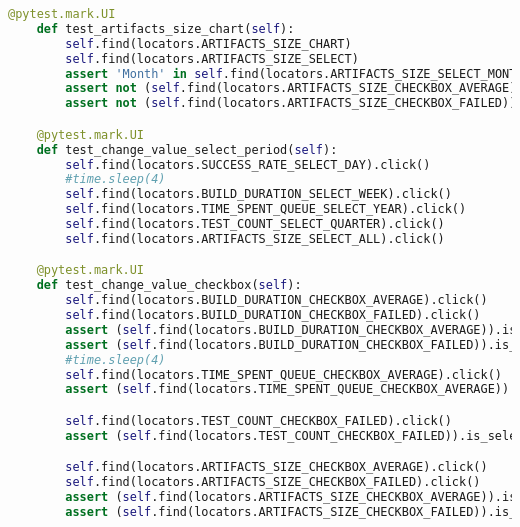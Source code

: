 \begin{lstlisting}[language=Python]
    @pytest.mark.UI
    def test_artifacts_size_chart(self):
        self.find(locators.ARTIFACTS_SIZE_CHART)
        self.find(locators.ARTIFACTS_SIZE_SELECT)
        assert 'Month' in self.find(locators.ARTIFACTS_SIZE_SELECT_MONTH).text
        assert not (self.find(locators.ARTIFACTS_SIZE_CHECKBOX_AVERAGE)).is_selected()
        assert not (self.find(locators.ARTIFACTS_SIZE_CHECKBOX_FAILED)).is_selected()

    @pytest.mark.UI
    def test_change_value_select_period(self):
        self.find(locators.SUCCESS_RATE_SELECT_DAY).click()
        #time.sleep(4)
        self.find(locators.BUILD_DURATION_SELECT_WEEK).click()
        self.find(locators.TIME_SPENT_QUEUE_SELECT_YEAR).click()
        self.find(locators.TEST_COUNT_SELECT_QUARTER).click()
        self.find(locators.ARTIFACTS_SIZE_SELECT_ALL).click()

    @pytest.mark.UI
    def test_change_value_checkbox(self):
        self.find(locators.BUILD_DURATION_CHECKBOX_AVERAGE).click()
        self.find(locators.BUILD_DURATION_CHECKBOX_FAILED).click()
        assert (self.find(locators.BUILD_DURATION_CHECKBOX_AVERAGE)).is_selected()
        assert (self.find(locators.BUILD_DURATION_CHECKBOX_FAILED)).is_selected()
        #time.sleep(4)
        self.find(locators.TIME_SPENT_QUEUE_CHECKBOX_AVERAGE).click()
        assert (self.find(locators.TIME_SPENT_QUEUE_CHECKBOX_AVERAGE)).is_selected()

        self.find(locators.TEST_COUNT_CHECKBOX_FAILED).click()
        assert (self.find(locators.TEST_COUNT_CHECKBOX_FAILED)).is_selected()

        self.find(locators.ARTIFACTS_SIZE_CHECKBOX_AVERAGE).click()
        self.find(locators.ARTIFACTS_SIZE_CHECKBOX_FAILED).click()
        assert (self.find(locators.ARTIFACTS_SIZE_CHECKBOX_AVERAGE)).is_selected()
        assert (self.find(locators.ARTIFACTS_SIZE_CHECKBOX_FAILED)).is_selected()




\end{lstlisting}


